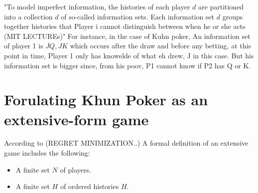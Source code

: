 \documentclass{article}
\begin{document}
"To model imperfect information, the histories of each player $d$ are partitioned into a collection $d$
of so-called information sets. Each information set $d$
 groups together histories that Player i cannot
distinguish between when he or she acts  (MIT LECTUREs)" For instance, in the case of Kuhn poker, An information set of player 1 is ${JQ, JK}$ which occurs after the draw and before any betting, at this point in time, Player 1 only has knowelde of what eh drew, J in this case. But his information set is bigger since, from his poov, P1 cannot know if P2 has Q or K. 



\section{Forulating Khun Poker as an extensive-form game}
According to (REGRET MINIMIZATION..)
A formal definition of an extensive game includes the following:

\begin{itemize}
\item A finite set $N$ of players. 
\item A finite set $H$ of ordered histories $H$.

\end{itemize}

\end{document}
